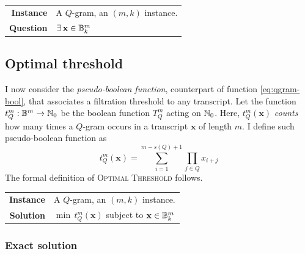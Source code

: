 
\begin{problem}
\begin{tabular}{rl}
{\bf Instance}	&	A $Q$-gram, an $(m,k)$ instance. \\
{\bf Question}	&	$\exists \, \mathbf{x} \in \mathbb {B}^m_k$ \st $T_{Q}^{m}(\mathbf{x}) = 0$? \\
\end{tabular}
\end{problem}


\subsection{Optimal threshold}
\label{sub:qgram-optimal-threshold}

I now consider the \emph{pseudo-boolean function}, counterpart of function \ref{eq:qgram-bool}, that associates a filtration threshold to any transcript.
Let the function $t_{Q}^{m}: \mathbb {B}^m \rightarrow \mathbb {N}_0$ be the boolean function $T_{Q}^{m}$ acting on $\mathbb {N}_0$.
Here, $t_{Q}^{m}(\mathbf{x})$ \emph{counts} how many times a $Q$-gram occurs in a transcript $\mathbf{x}$ of length $m$.
I define such pseudo-boolean function as
\begin{equation}
\label{eq:qgram-pseudo}
t_{Q}^{m}(\mathbf{x}) = \sum_{i=1}^{m-s(Q)+1} \prod_{j \in Q} x_{i+j}
\end{equation}
The formal definition of \textsc{Optimal Threshold} follows.

\begin{problem}
\begin{tabular}{rl}
{\bf Instance}	&	A $Q$-gram, an $(m,k)$ instance.\\
{\bf Solution}	&	$\min \, t_{Q}^{m}(\mathbf{x})$ subject to $\mathbf{x} \in \mathbb {B}^m_k$
\end{tabular}
\end{problem}

\subsubsection{Exact solution}


